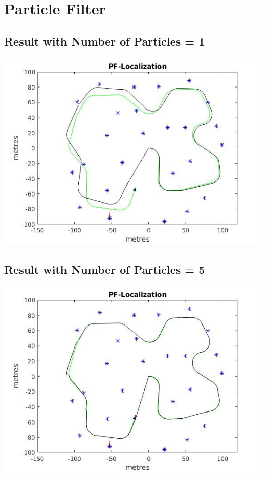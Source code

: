 \documentclass[a4paper,fleqn,11pt]{article}
\theoremstyle{mytheor}
\begin{document}
\pagebreak

\section{Particle Filter}

\subsection{Result with Number of Particles = 1}

\begin{center}
\includegraphics[scale = 0.74]{../images/PF-num1.jpg} \\
\end{center}

\subsection{Result with Number of Particles = 5}

\begin{center}
\includegraphics[scale = 0.74]{../images/PF-num5.jpg} \\
\end{center}
\end{document}
